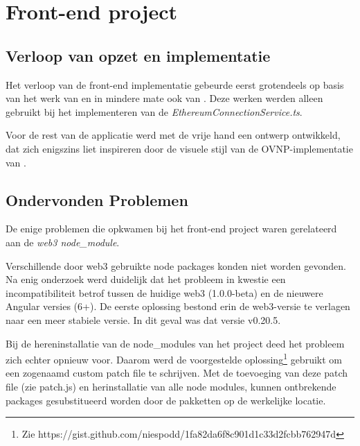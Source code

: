 \section{Front-end project}
	\subsection{Verloop van opzet en implementatie}
	Het verloop van de front-end implementatie gebeurde eerst grotendeels op basis van het werk van \textcite{Ranjan2018} en
	in mindere mate ook van \textcite{McCubin2019}. Deze werken werden alleen gebruikt bij het implementeren van de \textit{EthereumConnectionService.ts}. 
	
	Voor de rest van de applicatie werd met de vrije hand een ontwerp ontwikkeld, dat zich enigszins liet inspireren door de visuele stijl van de OVNP-implementatie van \textcite{McCorry2017}.
	\subsection{Ondervonden Problemen}
	De enige problemen die opkwamen bij het front-end project waren gerelateerd aan de \textit{web3 node\_module}. 
	
	Verschillende door web3 gebruikte node packages konden niet worden gevonden. Na enig onderzoek werd duidelijk dat het probleem in kwestie een incompatibiliteit betrof tussen de huidige web3 (1.0.0-beta) en de nieuwere Angular versies (6+). De  eerste oplossing bestond erin de web3-versie te verlagen naar een meer stabiele versie. In dit geval was dat versie v0.20.5. 
	
	Bij de hereninstallatie van de node\_modules van het project deed het probleem zich echter opnieuw voor. Daarom werd de voorgestelde oplossing\footnote{Zie https://gist.github.com/niespodd/1fa82da6f8c901d1c33d2fcbb762947d} gebruikt om een zogenaamd custom patch file te schrijven. Met de toevoeging van deze patch file (zie patch.js) en herinstallatie van alle node modules, kunnen ontbrekende packages gesubstitueerd worden door de pakketten op de werkelijke locatie.
	
	
